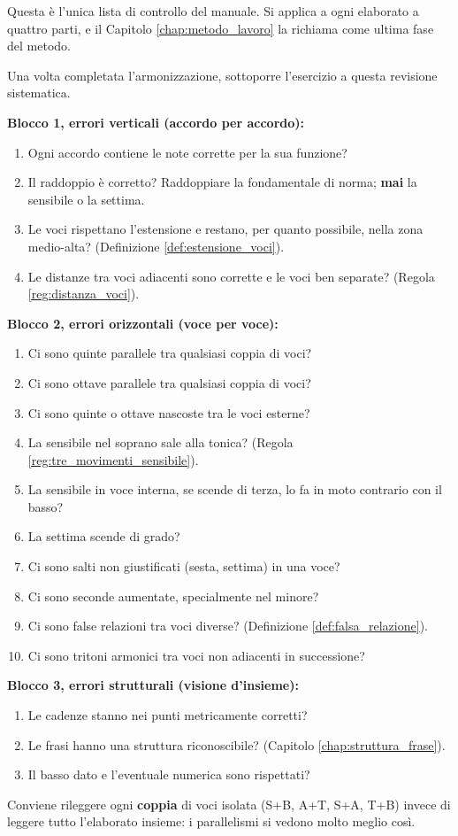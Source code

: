 Questa è l'unica lista di controllo del manuale. Si applica a ogni elaborato a quattro parti, e il Capitolo \ref{chap:metodo_lavoro} la richiama come ultima fase del metodo.

\begin{regola}
\label{reg:checklist_errori}
Una volta completata l'armonizzazione, sottoporre l'esercizio a questa revisione sistematica.

\textbf{Blocco 1, errori verticali (accordo per accordo):}
\begin{enumerate}
	\item Ogni accordo contiene le note corrette per la sua funzione?
	\item Il raddoppio è corretto? Raddoppiare la fondamentale di norma; \textbf{mai} la sensibile o la settima.
	\item Le voci rispettano l'estensione e restano, per quanto possibile, nella zona medio-alta? (Definizione \ref{def:estensione_voci}).
	\item Le distanze tra voci adiacenti sono corrette e le voci ben separate? (Regola \ref{reg:distanza_voci}).
\end{enumerate}

\textbf{Blocco 2, errori orizzontali (voce per voce):}
\begin{enumerate}
	\item Ci sono quinte parallele tra qualsiasi coppia di voci?
	\item Ci sono ottave parallele tra qualsiasi coppia di voci?
	\item Ci sono quinte o ottave nascoste tra le voci esterne?
	\item La sensibile nel soprano sale alla tonica? (Regola \ref{reg:tre_movimenti_sensibile}).
	\item La sensibile in voce interna, se scende di terza, lo fa in moto contrario con il basso?
	\item La settima scende di grado?
	\item Ci sono salti non giustificati (sesta, settima) in una voce?
	\item Ci sono seconde aumentate, specialmente nel minore?
	\item Ci sono false relazioni tra voci diverse? (Definizione \ref{def:falsa_relazione}).
	\item Ci sono tritoni armonici tra voci non adiacenti in successione?
\end{enumerate}

\textbf{Blocco 3, errori strutturali (visione d'insieme):}
\begin{enumerate}
	\item Le cadenze stanno nei punti metricamente corretti?
	\item Le frasi hanno una struttura riconoscibile? (Capitolo \ref{chap:struttura_frase}).
	\item Il basso dato e l'eventuale numerica sono rispettati?
\end{enumerate}
\end{regola}

Conviene rileggere ogni \textbf{coppia} di voci isolata (S+B, A+T, S+A, T+B) invece di leggere tutto l'elaborato insieme: i parallelismi si vedono molto meglio così.
